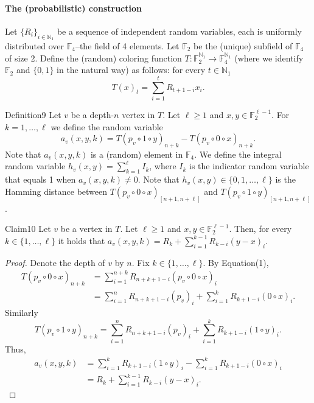 \paragraph{The (probabilistic) construction}
Let $\{R_i\}_{i\in\mathbb N_1}$ be a sequence of independent random variables, each is uniformly distributed over $\mathbb F_4$--the field of 4 elements. Let $\mathbb F_2$ be the (unique) subfield of $\mathbb F_4$ of size 2. Define the (random) coloring function $T:\mathbb F_2^{\mathbb N_1}\to\mathbb F_4^{\mathbb N_1}$ (where we identify $\mathbb F_2$ and $\{0,1\}$ in the natural way) as follows: for every $t\in\mathbb N_1$
\begin{equation}
T(x)_t=\sum_{i=1}^tR_{t+1-i}x_i.\tag{1}
\end{equation}
\begin{authorclaim}{Definition9}
Let $v$ be a depth-$n$ vertex in $T$. Let $\ell\ge1$ and $x,y\in\mathbb F_2^{\ell-1}$. For $k=1,\ldots,\ell$ we define the random variable
\[
a_v(x,y,k)=T(p_v\circ1\circ y)_{n+k}-T(p_v\circ0\circ x)_{n+k}.
\]
Note that $a_v(x,y,k)$ is a (random) element in $\mathbb F_4$. We define the integral random variable $h_v(x,y)=\sum_{k=1}^\ell I_k$, where $I_k$ is the indicator random variable that equals 1 when $a_v(x,y,k)\ne0$. Note that $h_v(x,y)\in\{0,1,\ldots,\ell\}$ is the Hamming distance between $T(p_v\circ0\circ x)_{[n+1,n+\ell]}$ and $T(p_v\circ1\circ y)_{[n+1,n+\ell]}$.
\end{authorclaim}
\begin{authorclaim}{Claim10}
Let $v$ be a vertex in $T$. Let $\ell\ge1$ and $x,y\in\mathbb F_2^{\ell-1}$. Then, for every $k\in\{1,\ldots,\ell\}$ it holds that $a_v(x,y,k)=R_k+\sum_{i=1}^{k-1}R_{k-i}(y-x)_i$.
\end{authorclaim}
\begin{proof}
Denote the depth of $v$ by $n$. Fix $k\in\{1,\ldots,\ell\}$. By Equation(1),
\begin{align*}
T(p_v\circ0\circ x)_{n+k}
&=\sum_{i=1}^{n+k}R_{n+k+1-i}(p_v\circ0\circ x)_i\\
&=\sum_{i=1}^nR_{n+k+1-i}(p_v)_i+\sum_{i=1}^kR_{k+1-i}(0\circ x)_i.
\end{align*}
Similarly
\[
T(p_v\circ1\circ y)_{n+k}
=\sum_{i=1}^nR_{n+k+1-i}(p_v)_i+\sum_{i=1}^kR_{k+1-i}(1\circ y)_i.
\]
Thus,
\begin{align*}
a_v(x,y,k)
&=\sum_{i=1}^kR_{k+1-i}(1\circ y)_i-\sum_{i=1}^kR_{k+1-i}(0\circ x)_i\\
&=R_k+\sum_{i=1}^{k-1}R_{k-i}(y-x)_i.
\end{align*}
\end{proof}
